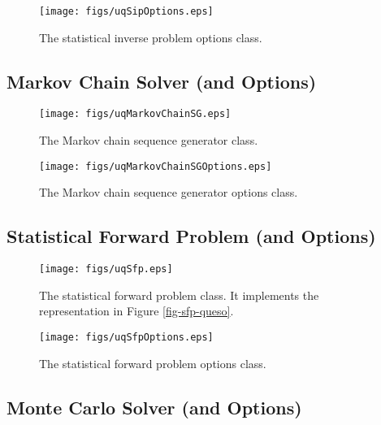 \begin{figure}[h!]
\begin{center}
\texttt{[image: figs/uqSipOptions.eps]}
\end{center}
\caption{
The statistical inverse problem options class.
}
\label{fig-sip-options-class}
\end{figure}

\clearpage
\subsection{Markov Chain Solver (and Options)}

\begin{figure}[h!]
\centerline{
\texttt{[image: figs/uqMarkovChainSG.eps]}
}
\caption{
The Markov chain sequence generator class.
}
\label{fig-markov-chain-solver-class}
\end{figure}

\begin{figure}[h!]
\begin{center}
\texttt{[image: figs/uqMarkovChainSGOptions.eps]}
\end{center}
\caption{
The Markov chain sequence generator options class.
}
\label{fig-markov-options-class}
\end{figure}

\clearpage
\subsection{Statistical Forward Problem (and Options)}

\begin{figure}[h!]
\centerline{
\texttt{[image: figs/uqSfp.eps]}
}
\caption{
The statistical forward problem class. It implements the representation in Figure \ref{fig-sfp-queso}.
}
\label{fig-sfp-class}
\end{figure}

\begin{figure}[h!]
\begin{center}
\texttt{[image: figs/uqSfpOptions.eps]}
\end{center}
\caption{
The statistical forward problem options class.
}
\label{fig-sfp-options-class}
\end{figure}

\clearpage
\subsection{Monte Carlo Solver (and Options)}

